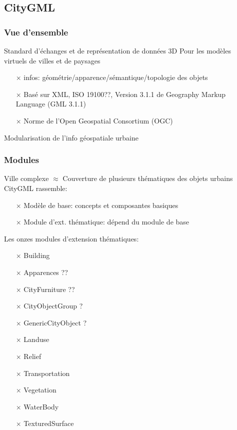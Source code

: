 \documentclass[11pt]{report}
\begin{document}
\subsection{CityGML} 

\subsubsection{Vue d'ensemble}

Standard d'échanges et de représentation de données 3D
Pour les modèles virtuels de villes et de paysages

\begin{itemize}
\item [$\times$] infos: géométrie/apparence/sémantique/topologie des objets
\item [$\times$] Basé sur XML, ISO 19100??, Version 3.1.1 de Geography Markup Language (GML 3.1.1)
\item [$\times$] Norme de l'Open Geospatial Consortium (OGC)
\end{itemize}

Modularisation de l'info géospatiale urbaine

\subsubsection{Modules}

Ville complexe $\approx$ Couverture de plusieurs thématiques des objets urbains
CityGML rassemble:
\begin{itemize}
\item [$\times$] Modèle de base: concepts et composantes basiques
\item [$\times$] Module d'ext. thématique: dépend du module de base\newline
\end{itemize}

Les onzes modules d'extension thématiques:
\begin{itemize}
\item [$\times$] Building
\item [$\times$] Apparences ??
\item [$\times$] CityFurniture ??
\item [$\times$] CityObjectGroup ?
\item [$\times$] GenericCityObject ?
\item [$\times$] Landuse
\item [$\times$] Relief
\item [$\times$] Transportation
\item [$\times$] Vegetation
\item [$\times$] WaterBody
\item [$\times$] TexturedSurface
\end{itemize}
\end{document}
